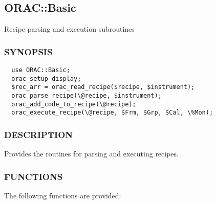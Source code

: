 \subsection{ORAC::Basic\label{ORAC::Basic}}

Recipe parsing and execution subroutines

\subsubsection*{SYNOPSIS\label{ORAC::Basic_SYNOPSIS}}\begin{verbatim}
  use ORAC::Basic;
  orac_setup_display;
  $rec_arr = orac_read_recipe($recipe, $instrument);
  orac_parse_recipe(\@recipe, $instrument);
  orac_add_code_to_recipe(\@recipe);
  orac_execute_recipe(\@recipe, $Frm, $Grp, $Cal, \%Mon);
\end{verbatim}
\subsubsection*{DESCRIPTION\label{ORAC::Basic_DESCRIPTION}}

Provides the routines for parsing and executing recipes.

\subsubsection*{FUNCTIONS\label{ORAC::Basic_FUNCTIONS}}

The following functions are provided:

